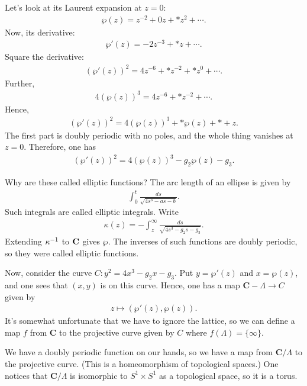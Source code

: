 \documentclass [11 pt, oneside] {article}
\begin{document}
Let's look at its Laurent expansion at $z=0$:
\begin{align*}
	\wp(z) = z^{-2} + 0 z + *z^2 + \cdots.
\end{align*}
Now, its derivative:
\begin{align*}
	\wp'(z) = -2z^{-3} + *z +\cdots.
\end{align*}
Square the derivative:
\begin{align*}
	(\wp'(z)) ^2 = 4z^{-6} + *z^{-2} + *z^0 + \cdots.
\end{align*}
Further,
\begin{align*}
	4(\wp(z)) ^3 = 4z^{-6} + *z^{-2} + \cdots.
\end{align*}
Hence,
\begin{align*}
	(\wp'(z)) ^2 = 4(\wp(z)) ^3 +  *\wp(z) + * + z.
\end{align*}
The first part is doubly periodic with no poles, and the whole thing vanishes at $z=0$. Therefore, one has
\begin{align*}
	(\wp'(z)) ^2 = 4(\wp(z)) ^3 - g_2 \wp(z) -  g_3.
\end{align*}

Why are these called elliptic functions? The arc length of an ellipse is given by 
\begin{align*}
	\int_{0}^{t} \frac{ds}{\sqrt{4s^3 - as - b} }. 
\end{align*}
Such integrals are called elliptic integrals. Write
\begin{align*}
	\kappa(z) = -\int_{z}^{\infty} \frac{ds}{\sqrt{4s^3 -g_2s - g_3} }. 
\end{align*}
Extending $\kappa^{-1}$ to $\mathbf C$ gives $\wp$. The inverses of such functions are doubly periodic, so they were called elliptic functions.

Now, consider the curve $C:y^2 = 4x^3 - g_2x-g_3$. Put $y=\wp'(z)$ and $x=\wp(z)$, and one sees that $(x,y)$ is on this curve. Hence, one has a map $\mathbf{C}-\Lambda \longrightarrow C$ given by
\begin{align*}
	z\longmapsto (\wp'(z),\wp (z)).
\end{align*}
It's somewhat unfortunate that we have to ignore the lattice, so we can define a map $f$ from $\mathbf{C}$ to the projective curve given by $C$ where $f(\Lambda) = \{\infty\}$. 

We have a doubly periodic function on our hands, so we have a map from $\mathbf{C}/\Lambda$ to the projective curve. (This is a homeomorphism of topological spaces.) One notices that $\mathbf{C}/\Lambda$ is isomorphic to $S^1\times S^1$ as a topological space, so it is a torus.
\end{document}
